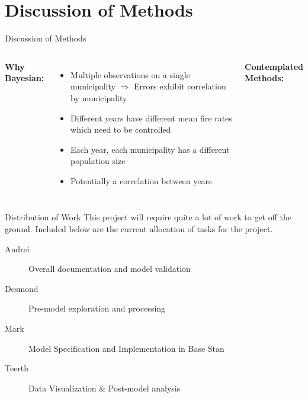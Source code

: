 \documentclass{beamer}
\begin{document}
\section{Discussion of Methods}
\begin{frame}{Discussion of Methods}
\begin{columns}

\textbf{Why Bayesian:} \vspace{0mm}
\begin{itemize}[<2->]
\item Multiple observations on a single municipality $\Rightarrow$ Errors exhibit correlation by municipality
\item Different years have different mean fire rates which need to be controlled
\item Each year, each municipality has a different population size
\item Potentially a correlation between years
\end{itemize}
\textbf{Contemplated Methods:} \vspace{0mm}
\end{columns}
\end{frame}

\begin{frame}{Distribution of Work}
This project will require quite a lot of work to get off the ground. Included below are the current allocation of tasks for the project.
\begin{description}
\item[Andrei] Overall documentation and model validation
\item[Desmond] Pre-model exploration and processing
\item[Mark] Model Specification and Implementation in Base Stan
\item[Teerth] Data Visualization \& Post-model analysis
\end{description}
\end{frame}
\end{document}
